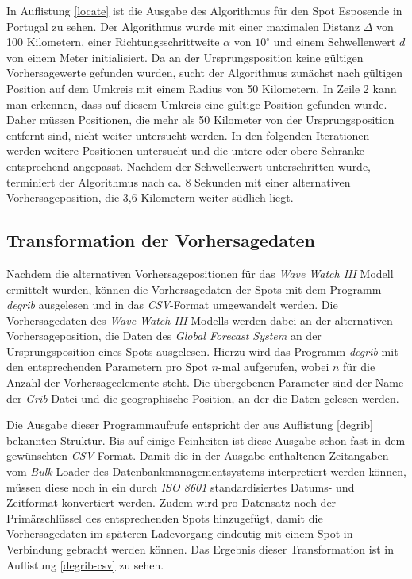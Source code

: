 In Auflistung \ref{locate} ist die Ausgabe des Algorithmus für den
Spot Esposende in Portugal zu sehen. Der Algorithmus wurde mit einer
maximalen Distanz $\Delta$ von 100 Kilometern, einer
Richtungsschrittweite $\alpha$ von $10^{\circ}$ und einem
Schwellenwert $d$ von einem Meter initialisiert. Da an der
Ursprungsposition keine gültigen Vorhersagewerte gefunden wurden,
sucht der Algorithmus zunächst nach gültigen Position auf dem Umkreis
mit einem Radius von 50 Kilometern. In Zeile 2 kann man erkennen, dass
auf diesem Umkreis eine gültige Position gefunden wurde. Daher müssen
Positionen, die mehr als 50 Kilometer von der Ursprungsposition
entfernt sind, nicht weiter untersucht werden. In den folgenden
Iterationen werden weitere Positionen untersucht und die untere oder
obere Schranke entsprechend angepasst. Nachdem der Schwellenwert
unterschritten wurde, terminiert der Algorithmus nach ca. 8 Sekunden
mit einer alternativen Vorhersageposition, die 3,6 Kilometern weiter
südlich liegt.



\subsection{Transformation der Vorhersagedaten}
Nachdem die alternativen Vorhersagepositionen für das \textit{Wave
  Watch III} Modell ermittelt wurden, können die Vorhersagedaten der
Spots mit dem Programm \textit{degrib} ausgelesen und in das
\textit{CSV}-Format umgewandelt werden. Die Vorhersagedaten des
\textit{Wave Watch III} Modells werden dabei an der alternativen
Vorhersageposition, die Daten des \textit{Global Forecast System} an
der Ursprungsposition eines Spots ausgelesen. Hierzu wird das Programm
\textit{degrib} mit den entsprechenden Parametern pro Spot $n$-mal
aufgerufen, wobei $n$ für die Anzahl der Vorhersageelemente steht. Die
übergebenen Parameter sind der Name der \textit{Grib}-Datei und die
geographische Position, an der die Daten gelesen werden.

Die Ausgabe dieser Programmaufrufe entspricht der aus Auflistung
\ref{degrib} bekannten Struktur. Bis auf einige Feinheiten ist diese
Ausgabe schon fast in dem gewünschten \textit{CSV}-Format. Damit die
in der Ausgabe enthaltenen Zeitangaben vom \textit{Bulk} Loader des
Datenbankmanagementsystems interpretiert werden können, müssen diese
noch in ein durch \textit{ISO 8601} standardisiertes Datums- und
Zeitformat konvertiert werden. Zudem wird pro Datensatz noch der
Primärschlüssel des entsprechenden Spots hinzugefügt, damit die
Vorhersagedaten im späteren Ladevorgang eindeutig mit einem Spot in
Verbindung gebracht werden können. Das Ergebnis dieser Transformation
ist in Auflistung \ref{degrib-csv} zu sehen.


